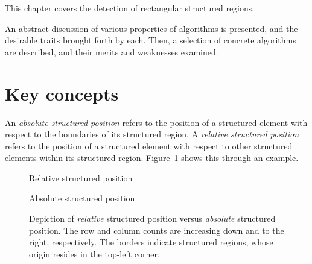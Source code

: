 \label{chap:rectangle-growth}
This chapter covers the detection of rectangular structured regions.

An abstract discussion of various properties of algorithms is presented, and the desirable traits brought forth by each.
Then, a selection of concrete algorithms are described, and their merits and weaknesses examined.


\section{Key concepts}
An \emph{absolute structured position} refers to the position of a structured element with respect to the boundaries of its structured region.
A \emph{relative structured position} refers to the position of a structured element with respect to other structured elements within its structured region. Figure~\ref{fig:structured-position} shows this through an example.


\begin{figure}
\newcommand{\nodesize}{1.2}
\newcommand{\rows}{4}
\newcommand{\cols}{4}
\newcommand{\rowsize}{\rows*\nodesize}
\newcommand{\colsize}{\cols*\nodesize+2*0.1}

\newcommand{\nodeat}[3]{
	\pgfmathsetmacro{\lerow}{ (\rows - #1) * \nodesize - (\nodesize / 2) - 0.1}
	\pgfmathsetmacro{\lecol}{ (#2 * \nodesize) + (\nodesize / 2) + 0.1}
	\node at (\lecol, \lerow) {#3}
}

\sidebyside
{
	\caption{Relative structured position\label{fig:relative-structured-position}}
}
{
	\caption{Absolute structured position\label{fig:absolute-structured-position}}
}
\caption{Depiction of \emph{relative} structured position versus \emph{absolute} structured position. The row and column counts are increasing down and to the right, respectively. The borders indicate structured regions, whose origin resides in the top-left corner.\label{fig:structured-position}}
\end{figure}




